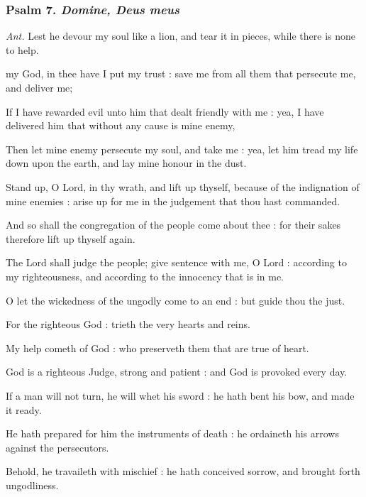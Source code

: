 \subsubsection{Psalm 7. \textit{Domine, Deus meus}}\par\noindent
\textit{Ant.} Lest he devour {\dag} my soul like a lion, and tear it in pieces, while there is none to help.\par
{} my God, in thee have I put my trust : save me from all them that persecute me, and deliver me;\par
{}
If I have rewarded evil unto him that dealt friendly with me : yea, I have delivered him that without any cause is mine enemy,\par
{}Then let mine enemy persecute my soul, and take me : yea, let him tread my life down upon the earth, and lay mine honour in the dust.\par
{}Stand up, O Lord, in thy wrath, and lift up thyself, because of the indignation of mine enemies : arise up for me in the judgement that thou hast commanded.\par
{}And so shall the congregation of the people come about thee : for their sakes therefore lift up thyself again.\par
{}The Lord shall judge the people; give sentence with me, O Lord : according to my righteousness, and according to the innocency that is in me.\par
{}O let the wickedness of the ungodly come to an end : but guide thou the just.\par
{}For the righteous God : trieth the very hearts and reins.\par
{}My help cometh of God : who preserveth them that are true of heart.\par
{}God is a righteous Judge, strong and patient : and God is provoked every day.\par
{}If a man will not turn, he will whet his sword : he hath bent his bow, and made it ready.\par
{}He hath prepared for him the instruments of death : he ordaineth his arrows against the persecutors.\par
{}Behold, he travaileth with mischief : he hath conceived sorrow, and brought forth ungodliness.\par

